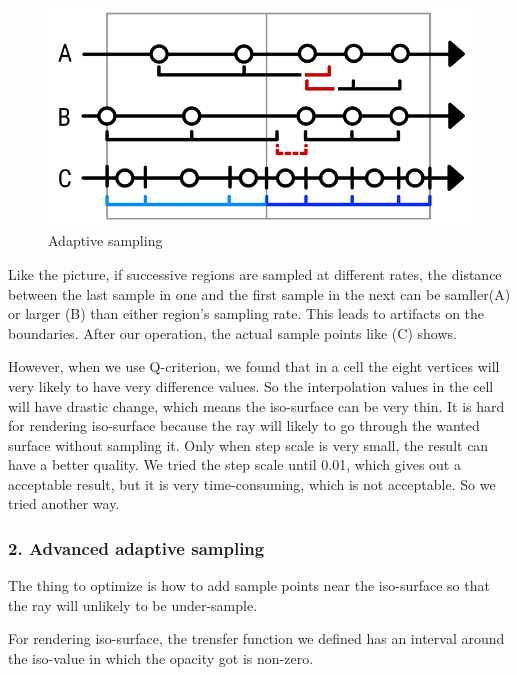 \documentclass[acmtog]{acmart}
\begin{document}
\begin{figure}[h]	
	\centering	
	\includegraphics[width=0.8\linewidth]
	{images/adaptive.png}
	\caption{Adaptive sampling}
\end{figure}
Like the picture, if successive regions are sampled at different rates, the distance between the last sample in one and the first sample in the next can be samller(A) or larger (B) than either region's sampling rate. This leads to artifacts on the boundaries. After our operation, the actual sample points like (C) shows.


However, when we use Q-criterion, we found that in a cell the eight vertices will very likely to have very difference values. So the interpolation values in the cell will have drastic change, which means the iso-surface can be very thin. It is hard for rendering iso-surface because the ray will likely to go through the wanted surface without sampling it. Only when step scale is very small, the result can have a better quality. We tried the step scale until 0.01, which gives out a acceptable result, but it is very time-consuming, which is not acceptable. So we tried another way.


\subsubsection{2. Advanced adaptive sampling}


The thing to optimize is how to add sample points near the iso-surface so that the ray will unlikely to be under-sample. 


For rendering iso-surface, the trensfer function we defined has an interval around the iso-value in which the opacity got is non-zero.
\end{document}
